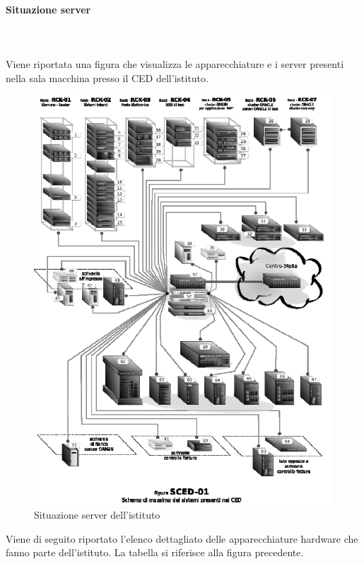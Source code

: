 \documentclass[12pt, a4paper, titlepage]{report}
\newcommand{\myparagraph}[1]{\paragraph{#1}\mbox{} \mbox{}}
\begin{document}
		\myparagraph{Situazione server}\\
		\\Viene riportata una figura che visualizza le apparecchiature e i server presenti nella sala macchina presso il CED dell'istituto.
		
		\begin{figure}[h]
		\centering
		\includegraphics[scale=1]{./img/server.png}
		\caption{Situazione server dell'istituto}
		\end{figure}
		\newpage
		Viene di seguito riportato l'elenco dettagliato delle apparecchiature hardware che fanno parte dell'istituto. La tabella si riferisce alla figura precedente.
\end{document}
